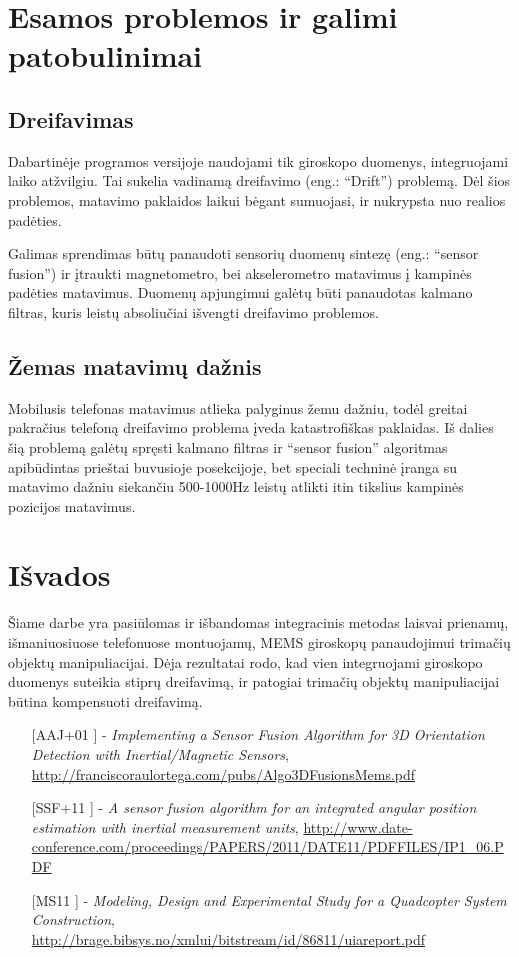 \documentclass[12pt, a4paper, lithuanian, final]{article}
\begin{document}
\section{Esamos problemos ir galimi patobulinimai}

\subsection{Dreifavimas}
Dabartinėje programos versijoje naudojami tik giroskopo duomenys, integruojami laiko atžvilgiu.
Tai sukelia vadinamą dreifavimo (eng.: "`Drift"') problemą.
Dėl šios problemos, matavimo paklaidos laikui bėgant sumuojasi, ir nukrypsta nuo realios padėties.

Galimas sprendimas būtų panaudoti sensorių duomenų sintezę (eng.: "`sensor fusion"') ir įtraukti magnetometro, bei akselerometro matavimus į kampinės padėties matavimus.
Duomenų apjungimui galėtų būti panaudotas kalmano filtras, kuris leistų absoliučiai išvengti dreifavimo problemos.

\subsection{Žemas matavimų dažnis}
Mobilusis telefonas matavimus atlieka palyginus žemu dažniu, todėl greitai pakračius telefoną dreifavimo problema įveda katastrofiškas paklaidas.
Iš dalies šią problemą galėtų spręsti kalmano filtras ir "`sensor fusion"' algoritmas apibūdintas prieštai buvusioje posekcijoje, bet speciali techninė įranga su matavimo dažniu siekančiu 500-1000Hz leistų atlikti itin tikslius kampinės pozicijos matavimus.

\section{Išvados}

Šiame darbe yra pasiūlomas ir išbandomas integracinis metodas laisvai prienamų, išmaniuosiuose telefonuose montuojamų, MEMS giroskopų panaudojimui trimačių objektų manipuliacijai.
Dėja rezultatai rodo, kad vien integruojami giroskopo duomenys suteikia stiprų dreifavimą, ir patogiai trimačių objektų manipuliacijai būtina kompensuoti dreifavimą.




\begin{itemize}
	\item [[AAJ+01]] - \textit{Implementing a Sensor Fusion Algorithm for 3D Orientation Detection with Inertial/Magnetic Sensors}, \url{http://franciscoraulortega.com/pubs/Algo3DFusionsMems.pdf}
	\item [[SSF+11]] - \textit{A sensor fusion algorithm for an integrated angular position estimation with inertial measurement units}, \url{http://www.date-conference.com/proceedings/PAPERS/2011/DATE11/PDFFILES/IP1_06.PDF}
	\item [[MS11]] - \textit{Modeling, Design and Experimental Study for a Quadcopter System Construction}, \url{http://brage.bibsys.no/xmlui/bitstream/id/86811/uiareport.pdf}
\end{itemize}
\end{document}
